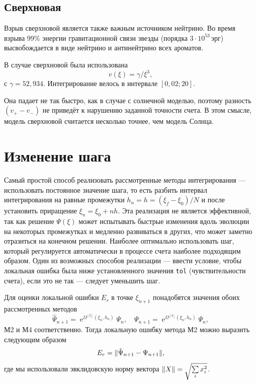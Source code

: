\documentclass[12pt]{article}
\DeclareMathOperator{\Exp}{e}
\DeclarePairedDelimiter{\norm}{\lVert}{\rVert}
\renewcommand\exp\Exp
\begin{document}
\subsection{Сверхновая}

Взрыв сверхновой является также важным источником нейтрино. Во время взрыва 99\%
энергии гравитационной связи звезды (порядка \(3\cdot10^{53}\,\text{эрг}\))
высвобождается в виде нейтрино и антинейтрино всех ароматов.

В случае сверхновой была использована
\begin{equation}
  v(\xi)=\gamma/\xi^3,
\end{equation}
с $\gamma=52{,}934$. Интегрирование велось в интервале $[0{,}02;20]$.

Она падает не так быстро, как в случае с солнечной моделью, поэтому разность
$(v_+-v_-)$ не приведёт к нарушению заданной точности счета. В этом смысле,
модель сверхновой считается несколько точнее, чем модель Солнца.

\section{Изменение шага}

Самый простой способ реализовать рассмотренные методы интегрирования —
использовать постоянное значение шага, то есть разбить интервал интегрирования
на равные промежутки $h_n=h=(\xi_f-\xi_0)/N$ и после установить приращение
$\xi_n=\xi_0+nh$. Эта реализация не является эффективной, так как решение
$\Psi(\xi)$ может испытывать быстрые изменения вдоль эволюции на некоторых
промежутках и медленно развиваться в других, что может заметно отразиться на
конечном решении. Наиболее оптимально использовать шаг, который регулируется
автоматически в процессе счета наиболее подходящим образом.  Один из возможных
способов реализации — ввести условие, чтобы локальная ошибка была ниже
установленного значения \verb|tol| (чувствительности счета), если это не так —
следует уменьшить шаг.

Для оценки локальной ошибки $E_r$ в точке $\xi_{n+1}$ понадобятся значения обоих
рассмотренных методов
\begin{equation}
  \hat\Psi_{n+1}=\exp^{\Omega^{[2]}(\xi_n,h_n)}\Psi_n,
  \quad
  \Psi_{n+1}=\exp^{\Omega^{[4]}(\xi_n,h_n)}\Psi_n,
\end{equation}
М2 и М4 соответственно. Тогда локальную ошибку метода М2 можно выразить
следующим образом
\begin{equation}\label{Er}
  E_r=\norm{\hat\Psi_{n+1} - \Psi_{n+1}},
\end{equation}
где мы использовали эвклидовскую норму вектора
$\norm{X}=\sqrt{\sum\limits_i x^2_i}$.
\end{document}
